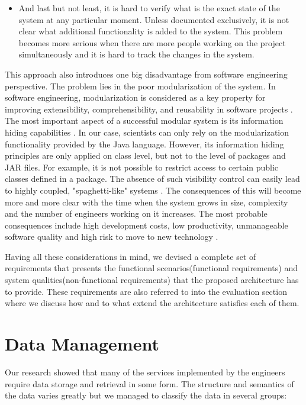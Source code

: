 \begin{itemize}
	\item And last but not least, it is hard to verify what is the exact state of the system at any particular moment. Unless documented exclusively, it is not clear what additional functionality is added to the system. This problem becomes more serious when there are more people working on the project simultaneously and it is hard to track the changes in the system.
		
\end{itemize}

This approach also introduces one big disadvantage from software engineering perspective. The problem lies in the poor modularization of the system. In software engineering, modularization is considered as a key property for improving extensibility, comprehensibility, and reusability in software projects \cite{Parnas}. The most important aspect of a successful modular system is its information hiding capabilities \cite{Srivastava}. In our case, scientists can only rely on the modularization functionality provided by the Java language. However, its information hiding principles are only applied on class level, but not to the level of packages and JAR files. For example, it is not possible to restrict access to certain public classes defined in a package. The absence of such visibility control can easily lead to highly coupled, "spaghetti-like" systems \cite{Eder}. The consequences of this will become more and more clear with the time when the system grows in size, complexity and the number of engineers working on it increases. The most probable consequences include high development costs, low productivity, unmanageable software quality and high risk to move to new technology \cite{Cai}.

Having all these considerations in mind, we devised a complete set of requirements that presents the functional scenarios(functional requirements) and system qualities(non-functional requirements) that the proposed architecture has to provide. These requirements are also referred to into the evaluation section where we discuss how and to what extend the architecture satisfies each of them.

\section{Data Management}
\label{sec:problemDefStorage}

Our research showed that many of the services implemented by the engineers require data storage and retrieval in some form. The structure and semantics of the data varies greatly but we managed to classify the data in several groups:

